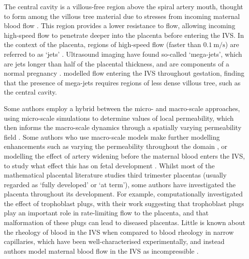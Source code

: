         The central cavity is a villous-free region above the spiral artery mouth, thought to form among the villous tree material due to stresses from incoming maternal blood flow \cite{burtonRheologicalPhysiologicalConsequences2009,saghianAssociationPlacentalJets2017}. This region provides a lower resistance to flow, allowing incoming high-speed flow to penetrate deeper into the placenta before entering the IVS. In the context of the placenta, regions of high-speed flow (faster than $\qty{0.1}{\metre\per\second}$) are referred to as `jets' \cite{saghianAssociationPlacentalJets2017}. Ultrasound imaging have found so-called `mega-jets', which are jets longer than half of the placental thickness, and are components of a normal pregnancy \cite{collinsDevelopmentalChangesSpiral2012}. \citeauthor{saghianAssociationPlacentalJets2017} \cite{saghianAssociationPlacentalJets2017} modelled flow entering the IVS throughout gestation, finding that the presence of mega-jets requires regions of less dense villous tree, such as the central cavity. 
        
        Some authors employ a hybrid between the micro- and macro-scale approaches, using micro-scale simulations to determine values of local permeability, which then informs the macro-scale dynamics through a spatially varying permeability field \cite{lecarpentierComputationalFluidDynamic2016,linMultiscaleModelPlacental2016}. Some authors who use macro-scale models make further modelling enhancements such as varying the permeability throughout the domain \cite{lecarpentierComputationalFluidDynamic2016,erianMaternalPlacentalBlood1977}, or modelling the effect of artery widening before the maternal blood enters the IVS, to study what effect this has on fetal development \cite{burtonRheologicalPhysiologicalConsequences2009,rothDynamicModelingUteroplacental2017,saghianAssociationPlacentalJets2017}. Whilst most of the mathematical placental literature studies third trimester placentas (usually regarded as `fully developed' or `at term'), some authors have investigated the placenta throughout its development. For example, \citeauthor{jamesTrophoblastPlugsImpact2018} \cite{jamesTrophoblastPlugsImpact2018} computationally investigated the effect of trophoblast plugs, with their work suggesting that trophoblast plugs play an important role in rate-limiting flow to the placenta, and that malformation of these plugs can lead to diseased placentas. Little is known about the rheology of blood in the IVS when compared to blood rheology in narrow capillaries, which have been well-characterised experimentally, and instead authors model maternal blood flow in the IVS as incompressible \cite{chernyavskyMathematicalModelIntervillous2010}.

